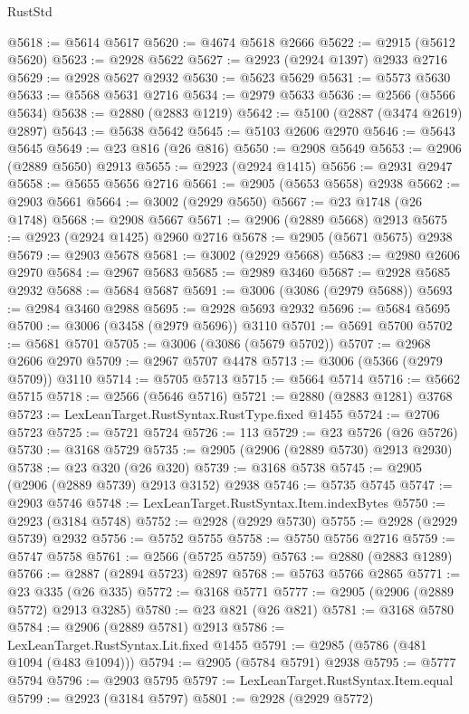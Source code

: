 \begin{lexlean}{RustStd}
\begin{coremodule}
{\begin{coremodule}
{{{{{{{{{{{{{{{{{{{{{{{{{{{{{{{{{{{{{{{{{{{{{{{{{{{{{{{{{{{{{{{{{{{{{{{{{{{{{{@5618 := @5614 @5617
@5620 := @4674 @5618 @2666
@5622 := @2915 (@5612 @5620)
@5623 := @2928 @5622
@5627 := @2923 (@2924 @1397) @2933 @2716
@5629 := @2928 @5627 @2932
@5630 := @5623 @5629
@5631 := @5573 @5630
@5633 := @5568 @5631 @2716
@5634 := @2979 @5633
@5636 := @2566 (@5566 @5634)
@5638 := @2880 (@2883 @1219)
@5642 := @5100 (@2887 (@3474 @2619) @2897)
@5643 := @5638 @5642
@5645 := @5103 @2606 @2970
@5646 := @5643 @5645
@5649 := @23 @816 (@26 @816)
@5650 := @2908 @5649
@5653 := @2906 (@2889 @5650) @2913
@5655 := @2923 (@2924 @1415)
@5656 := @2931 @2947
@5658 := @5655 @5656 @2716
@5661 := @2905 (@5653 @5658) @2938
@5662 := @2903 @5661
@5664 := @3002 (@2929 @5650)
@5667 := @23 @1748 (@26 @1748)
@5668 := @2908 @5667
@5671 := @2906 (@2889 @5668) @2913
@5675 := @2923 (@2924 @1425) @2960 @2716
@5678 := @2905 (@5671 @5675) @2938
@5679 := @2903 @5678
@5681 := @3002 (@2929 @5668)
@5683 := @2980 @2606 @2970
@5684 := @2967 @5683
@5685 := @2989 @3460
@5687 := @2928 @5685 @2932
@5688 := @5684 @5687
@5691 := @3006 (@3086 (@2979 @5688))
@5693 := @2984 @3460 @2988
@5695 := @2928 @5693 @2932
@5696 := @5684 @5695
@5700 := @3006 (@3458 (@2979 @5696)) @3110
@5701 := @5691 @5700
@5702 := @5681 @5701
@5705 := @3006 (@3086 (@5679 @5702))
@5707 := @2968 @2606 @2970
@5709 := @2967 @5707 @4478
@5713 := @3006 (@5366 (@2979 @5709)) @3110
@5714 := @5705 @5713
@5715 := @5664 @5714
@5716 := @5662 @5715
@5718 := @2566 (@5646 @5716)
@5721 := @2880 (@2883 @1281) @3768
@5723 := LexLeanTarget.RustSyntax.RustType.fixed @1455
@5724 := @2706 @5723
@5725 := @5721 @5724
@5726 := 113
@5729 := @23 @5726 (@26 @5726)
@5730 := @3168 @5729
@5735 := @2905 (@2906 (@2889 @5730) @2913 @2930)
@5738 := @23 @320 (@26 @320)
@5739 := @3168 @5738
@5745 := @2905 (@2906 (@2889 @5739) @2913 @3152) @2938
@5746 := @5735 @5745
@5747 := @2903 @5746
@5748 := LexLeanTarget.RustSyntax.Item.indexBytes
@5750 := @2923 (@3184 @5748)
@5752 := @2928 (@2929 @5730)
@5755 := @2928 (@2929 @5739) @2932
@5756 := @5752 @5755
@5758 := @5750 @5756 @2716
@5759 := @5747 @5758
@5761 := @2566 (@5725 @5759)
@5763 := @2880 (@2883 @1289)
@5766 := @2887 (@2894 @5723) @2897
@5768 := @5763 @5766 @2865
@5771 := @23 @335 (@26 @335)
@5772 := @3168 @5771
@5777 := @2905 (@2906 (@2889 @5772) @2913 @3285)
@5780 := @23 @821 (@26 @821)
@5781 := @3168 @5780
@5784 := @2906 (@2889 @5781) @2913
@5786 := LexLeanTarget.RustSyntax.Lit.fixed @1455
@5791 := @2985 (@5786 (@481 @1094 (@483 @1094)))
@5794 := @2905 (@5784 @5791) @2938
@5795 := @5777 @5794
@5796 := @2903 @5795
@5797 := LexLeanTarget.RustSyntax.Item.equal
@5799 := @2923 (@3184 @5797)
@5801 := @2928 (@2929 @5772)
}}}}}}}}}}}}}}}}}}}}}}}}}}}}}}}}}}}}}}}}}}}}}}}}}}}}}}}}}}}}}}}}}}}}}}}}}}}}}}
\end{coremodule}}
\end{coremodule}
\end{lexlean}
